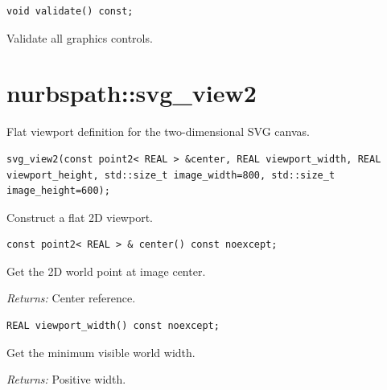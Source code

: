 \par\noindent\begin{minipage}{\linewidth}
\begin{lstlisting}[style=apireference]
void validate() const;
\end{lstlisting}
{\footnotesize Validate all graphics controls.\par}
\end{minipage}\par\vspace{1pt}
\section{nurbspath::svg\_view2}
Flat viewport definition for the two-dimensional SVG canvas.
\par\noindent\begin{minipage}{\linewidth}
\begin{lstlisting}[style=apireference]
svg_view2(const point2< REAL > &center, REAL viewport_width, REAL viewport_height, std::size_t image_width=800, std::size_t image_height=600);
\end{lstlisting}
{\footnotesize Construct a flat 2D viewport.\par}
\end{minipage}\par\vspace{1pt}
\par\noindent\begin{minipage}{\linewidth}
\begin{lstlisting}[style=apireference]
const point2< REAL > & center() const noexcept;
\end{lstlisting}
{\footnotesize Get the 2D world point at image center.\par}
{\footnotesize\textit{Returns:} Center reference.\par}
\end{minipage}\par\vspace{1pt}
\par\noindent\begin{minipage}{\linewidth}
\begin{lstlisting}[style=apireference]
REAL viewport_width() const noexcept;
\end{lstlisting}
{\footnotesize Get the minimum visible world width.\par}
{\footnotesize\textit{Returns:} Positive width.\par}
\end{minipage}\par\vspace{1pt}
